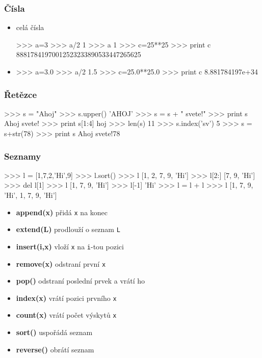 \documentclass[red,handout,professionalfont]{beamer}
\theoremstyle{definition}
\newcommand{\0}{\mbox{${\bf 0}$}}
\begin{document}
\begin{frame}[fragile]\frametitle{Čísla}
 \begin{itemize}
  \item celá čísla
  \begin{python}
>>> a=3
>>> a/2
1
>>> a%
1
>>> c=25**25
>>> print c
88817841970012523233890533447265625
  \end{python}
  \item {}
  \begin{python}
>>> a=3.0
>>> a/2
1.5
>>> c=25.0**25.0
>>> print c
8.881784197e+34   
  \end{python}
\end{itemize}
\end{frame}

\begin{frame}[fragile]\frametitle{Řetězce}
  \begin{python}
>>> s = "Ahoj"
>>> s.upper()
'AHOJ'
>>> s = s + " svete!"
>>> print s
Ahoj svete!
>>> print s[1:4]
hoj
>>> len(s)
11
>>> s.index('sv')
5
>>> s = s+str(78)
>>> print s
Ahoj svete!78
  \end{python}
\end{frame}

\begin{frame}[fragile]\frametitle{Seznamy}
\begin{minipage}{4.9cm}
\begin{python}
>>> l = [1,7,2,'Hi',9]
>>> l.sort()
>>> l
[1, 2, 7, 9, 'Hi']
>>> l[2:]
[7, 9, 'Hi']
>>> del l[1]
>>> l
[1, 7, 9, 'Hi']
>>> l[-1]
'Hi'
>>> l = l + l
>>> l
[1, 7, 9, 'Hi', 1, 7, 9, 'Hi']
\end{python}\pause
\end{minipage}
\begin{minipage}{5.7cm}
{\small
 \begin{itemize}
  \item[] {\bf append(x)} přidá {\tt x} na konec
  \item[] {\bf extend(L)} prodlouží o seznam {\tt L}
  \item[] {\bf insert(i,x)} vloží {\tt x} na {\tt i}-tou pozici
  \item[] {\bf remove(x)} odstraní první {\tt x}
  \item[] {\bf pop()} odstraní poslední prvek a vrátí ho
  \item[] {\bf index(x)} vrátí pozici prvního {\tt x}
  \item[] {\bf count(x)} vrátí počet výskytů {\tt x}
  \item[] {\bf sort()} uspořádá seznam
  \item[] {\bf reverse()} obrátí seznam
 \end{itemize}
 }
\end{minipage}


\end{frame}
\end{document}
